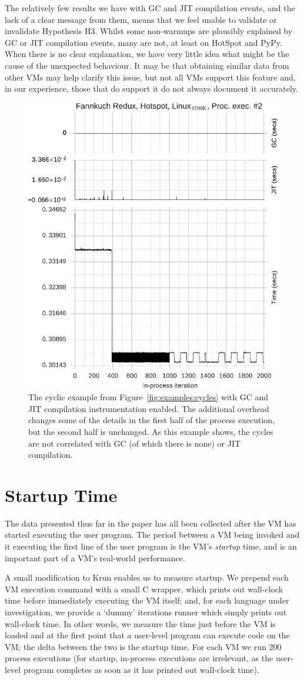 \documentclass[preprint,numbers,10pt]{sigplanconf}
\newcommand{\krun}{Krun\xspace}
\begin{document}
The relatively few results we have with GC and JIT compilation events, and the lack of a clear
message from them, means that we feel unable to validate or invalidate
Hypothesis H3. Whilst some non-warmups are plausibly explained by GC or JIT compilation events, many are not, at
least on HotSpot and PyPy. When there is no clear explanation, we have very little idea what might be
the cause of the unexpected behaviour. It may be that obtaining similar data
from other VMs may help clarify this issue, but not all VMs support this
feature and, in our experience, those that do support it do not always
document it accurately.

\begin{figure}[tbp]
\centering
\includegraphics[width=.45\textwidth]{examples/new_good_comp.pdf}
\caption{The cyclic example from Figure~\ref{fig:examples:cycles} with
GC and JIT compilation instrumentation enabled. The additional overhead
changes some of the details in the first half of the process
execution, but the second half is unchanged. As this example shows, the
cycles are not correlated with GC (of which there is none) or JIT compilation.}
\label{fig:goodcomp}
\end{figure}

\section{Startup Time}
\label{sec:startup}

The data presented thus far in the paper has all been collected after the VM has
started executing the user program. The period between a VM being
invoked and it executing the first line of the user program is the VM's \emph{startup} time,
and is an important part of a VM's real-world performance.

A small modification to \krun enables us to measure startup. We prepend each VM
execution command with a small C wrapper, which prints out wall-clock time
before immediately executing the VM itself; and, for each language under
investigation, we provide a `dummy' iterations runner which simply prints out
wall-clock time. In other words, we measure the time just before the VM is loaded
and at the first point that a user-level program can execute code on the VM; the
delta between the two is the startup time. For each VM we run 200 process
executions (for startup, in-process executions are irrelevant,
as the user-level program completes as soon as it has printed out wall-clock
time).
\end{document}

